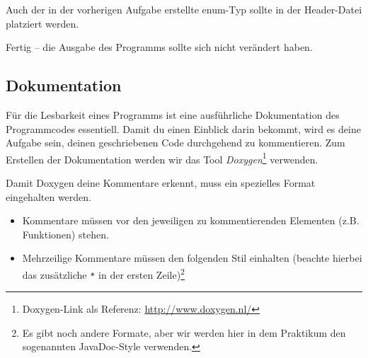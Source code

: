 
Auch der in der vorherigen Aufgabe erstellte enum-Typ sollte in der Header-Datei platziert werden.

Fertig -- die Ausgabe des Programms sollte sich nicht verändert haben.


\subsection{Dokumentation} \label{basics:doc}
Für die Lesbarkeit eines Programms ist eine ausführliche Dokumentation des Programmcodes essentiell.
Damit du einen Einblick darin bekommt, wird es deine Aufgabe sein, deinen geschriebenen Code durchgehend zu kommentieren. 
Zum Erstellen der Dokumentation werden wir das Tool \emph{Doxygen}\footnote{Doxygen-Link als Referenz: \url{http://www.doxygen.nl/}} verwenden.

Damit Doxygen deine Kommentare erkennt, muss ein spezielles Format eingehalten werden.
\begin{itemize}
    \item Kommentare müssen vor den jeweiligen zu kommentierenden Elementen (z.B. Funktionen) stehen.
    \item{Mehrzeilige Kommentare müssen den folgenden Stil einhalten (beachte hierbei das zusätzliche \lstinline{*} in der ersten Zeile)\footnote{Es gibt noch andere Formate, aber wir werden hier in dem Praktikum den sogenannten JavaDoc-Style verwenden.}
    
		}
\end{itemize}

